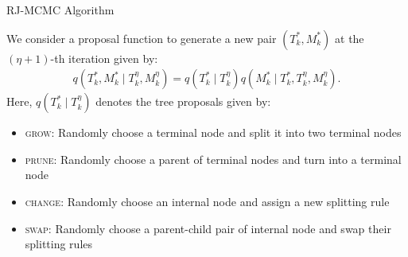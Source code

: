 \documentclass[11pt]{beamer}
\begin{document}
\begin{frame}[shrink=10]{RJ-MCMC Algorithm}

        We consider a proposal function to generate a new pair $\left(T_k^\ast, M_k^\ast\right)$ at the $(\eta+1)$-th iteration given by:
\begin{align}\label{eq:prop}
	q\left(T_k^\ast, M_k^\ast \mid T_k^{\eta},M_k^{\eta}\right) = q\left( T_k^\ast\mid T_k^{\eta}\right) q\left(M_k^\ast\mid T_k^\ast, T_k^{\eta}, M_k^{\eta}\right).
\end{align}
Here, $q\left( T_k^\ast\mid T_k^{\eta}\right)$ denotes the tree proposals given by:
\begin{itemize}
	\item \textsc{grow}: Randomly choose a terminal node and split it into two terminal nodes
	\item \textsc{prune}: Randomly choose a parent of terminal nodes and turn into a terminal node
	\item \textsc{change}: Randomly choose an internal node and assign a new splitting rule
	\item \textsc{swap}: Randomly choose a parent-child pair of internal node and swap their splitting rules
\end{itemize}
\end{frame}
    
\end{document}
